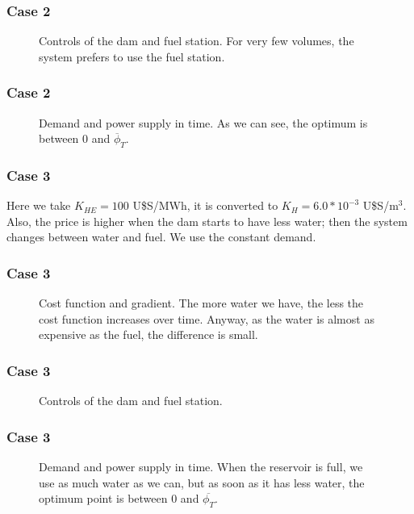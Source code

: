 \documentclass[aspectratio=169]{beamer}\usepackage[utf8]{inputenc}
\begin{document}
\begin{frame}\frametitle{Case 2}
\begin{figure}[ht!]
\centering
{}
\caption{Controls of the dam and fuel station. For very few volumes, the system prefers to use the fuel station.}
\end{figure}
\end{frame}

\begin{frame}\frametitle{Case 2}
\begin{figure}[ht!]
\centering
{}
\caption{Demand and power supply in time. As we can see, the optimum is between $0$ and $\overline{\phi}_T$.}
\end{figure}
\end{frame}

\begin{frame}\frametitle{Case 3}
Here we take $K_{HE}=100$ U\$S/MWh, it is converted to $K_H=6.0*10^{-3}$ U\$S/m$^3$. Also, the price is higher when the dam starts to have less water; then the system changes between water and fuel. We use the constant demand.
\end{frame}

\begin{frame}\frametitle{Case 3}
\begin{figure}[ht!]
\centering
{}
\caption{Cost function and gradient. The more water we have, the less the cost function increases over time. Anyway, as the water is almost as expensive as the fuel, the difference is small.}
\end{figure}
\end{frame}

\begin{frame}\frametitle{Case 3}
\begin{figure}[ht!]
\centering
{}
\caption{Controls of the dam and fuel station.}
\end{figure}
\end{frame}

\begin{frame}\frametitle{Case 3}
\begin{figure}[ht!]
\centering
{}
\caption{Demand and power supply in time. When the reservoir is full, we use as much water as we can, but as soon as it has less water, the optimum point is between $0$ and $\overline{\phi_T}$.}
\end{figure}
\end{frame}
\end{document}
